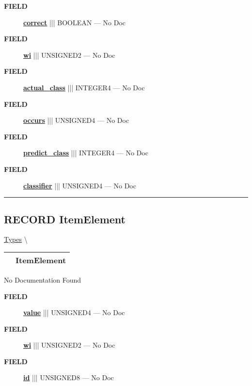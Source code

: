 \par
\begin{description}
\item [\colorbox{tagtype}{\color{white} \textbf{\textsf{FIELD}}}] \textbf{\underline{correct}} ||| BOOLEAN --- No Doc
\item [\colorbox{tagtype}{\color{white} \textbf{\textsf{FIELD}}}] \textbf{\underline{wi}} ||| UNSIGNED2 --- No Doc
\item [\colorbox{tagtype}{\color{white} \textbf{\textsf{FIELD}}}] \textbf{\underline{actual\_class}} ||| INTEGER4 --- No Doc
\item [\colorbox{tagtype}{\color{white} \textbf{\textsf{FIELD}}}] \textbf{\underline{occurs}} ||| UNSIGNED4 --- No Doc
\item [\colorbox{tagtype}{\color{white} \textbf{\textsf{FIELD}}}] \textbf{\underline{predict\_class}} ||| INTEGER4 --- No Doc
\item [\colorbox{tagtype}{\color{white} \textbf{\textsf{FIELD}}}] \textbf{\underline{classifier}} ||| UNSIGNED4 --- No Doc
\end{description}





\rule{\linewidth}{0.5pt}
\subsection*{\textsf{\colorbox{headtoc}{\color{white} RECORD}
ItemElement}}

\hypertarget{ecldoc:ml_core.types.itemelement}{}
\hspace{0pt} \hyperlink{ecldoc:ML_Core.Types}{Types} \textbackslash 

{\renewcommand{\arraystretch}{1.5}
\begin{tabularx}{\textwidth}{|>{\raggedright\arraybackslash}l|X|}
\hline
\hspace{0pt}\mytexttt{\color{red} } & \textbf{ItemElement} \\
\hline
\end{tabularx}
}

\par





No Documentation Found







\par
\begin{description}
\item [\colorbox{tagtype}{\color{white} \textbf{\textsf{FIELD}}}] \textbf{\underline{value}} ||| UNSIGNED4 --- No Doc
\item [\colorbox{tagtype}{\color{white} \textbf{\textsf{FIELD}}}] \textbf{\underline{wi}} ||| UNSIGNED2 --- No Doc
\item [\colorbox{tagtype}{\color{white} \textbf{\textsf{FIELD}}}] \textbf{\underline{id}} ||| UNSIGNED8 --- No Doc
\end{description}





